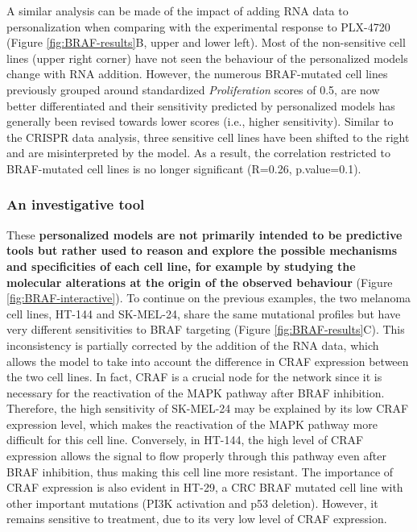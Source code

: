 \documentclass[a4paper,12pt,twoside,onecolumn,openright,final,oldfontcommands]{memoir}
\begin{document}
A similar analysis can be made of the impact of adding RNA data to
personalization when comparing with the experimental response to
PLX-4720 (Figure \ref{fig:BRAF-results}B, upper and lower left). Most of
the non-sensitive cell lines (upper right corner) have not seen the
behaviour of the personalized models change with RNA addition. However,
the numerous BRAF-mutated cell lines previously grouped around
standardized \emph{Proliferation} scores of 0.5, are now better
differentiated and their sensitivity predicted by personalized models
has generally been revised towards lower scores (i.e., higher
sensitivity). Similar to the CRISPR data analysis, three sensitive cell
lines have been shifted to the right and are misinterpreted by the
model. As a result, the correlation restricted to BRAF-mutated cell
lines is no longer significant (R=0.26, p.value=0.1).

\subsubsection{An investigative tool}\label{an-investigative-tool}

These \textbf{personalized models are not primarily intended to be
predictive tools but rather used to reason and explore the possible
mechanisms and specificities of each cell line, for example by studying
the molecular alterations at the origin of the observed behaviour}
(Figure \ref{fig:BRAF-interactive}). To continue on the previous
examples, the two melanoma cell lines, HT-144 and SK-MEL-24, share the
same mutational profiles but have very different sensitivities to BRAF
targeting (Figure \ref{fig:BRAF-results}C). This inconsistency is
partially corrected by the addition of the RNA data, which allows the
model to take into account the difference in CRAF expression between the
two cell lines. In fact, CRAF is a crucial node for the network since it
is necessary for the reactivation of the MAPK pathway after BRAF
inhibition. Therefore, the high sensitivity of SK-MEL-24 may be
explained by its low CRAF expression level, which makes the reactivation
of the MAPK pathway more difficult for this cell line. Conversely, in
HT-144, the high level of CRAF expression allows the signal to flow
properly through this pathway even after BRAF inhibition, thus making
this cell line more resistant. The importance of CRAF expression is also
evident in HT-29, a CRC BRAF mutated cell line with other important
mutations (PI3K activation and p53 deletion). However, it remains
sensitive to treatment, due to its very low level of CRAF expression.
\end{document}
